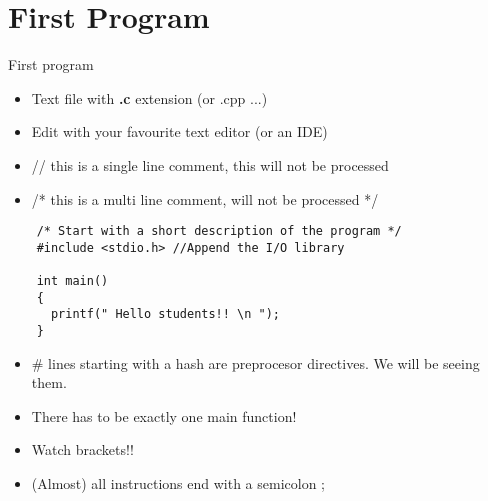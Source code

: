 \documentclass[10pt]{beamer}
\begin{document}

\section{First Program}

\begin{frame}[fragile]{First program}
      \begin{itemize}
        \item Text file with {\bf .c} extension (or .cpp ...)
        \item Edit with your favourite text editor (or an IDE)
        \item // this is a single line comment, this will not be processed
        \item /* this is a multi line comment, will not be processed */
      \end{itemize}

    \begin{lstlisting}
    /* Start with a short description of the program */
    #include <stdio.h> //Append the I/O library
   
    int main()
    {
      printf(" Hello students!! \n ");
    }
    \end{lstlisting}  
   
    \begin{itemize}
      \item \# lines starting with a hash are preprocesor directives. We will be seeing them.
      \item There has to be exactly one main function!
      \item Watch brackets!!
      \item (Almost) all instructions end with a semicolon ;
    \end{itemize}
   
\end{frame}
\end{document}
